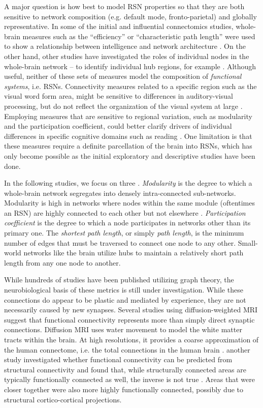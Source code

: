 A major question is how best to model RSN properties so that they are both sensitive to network composition (e.g. default mode, fronto-parietal) and globally representative. In some of the initial and influential connectomics studies, whole-brain measures such as the ``efficiency'' or ``characteristic path length'' were used to show a relationship between intelligence and network architecture \citep{Stam2014}. On the other hand, other studies have investigated the roles of individual nodes in the whole-brain network -- to identify individual hub regions, for example \citep{Betzel2013}. Although useful, neither of these sets of measures model the composition of \textit{functional systems}, i.e. RSNs. Connectivity measures related to a specific region such as the visual word form area, might be sensitive to differences in auditory-visual processing, but do not reflect the organization of the visual system at large \citep{Rubinov2010}. Employing measures that are sensitive to regional variation, such as modularity and the participation coefficient, could better clarify drivers of individual differences in specific cognitive domains such as reading \citep{Cao2016}. One limitation is that these measures require a definite parcellation of the brain into RSNs, which has only become possible as the initial exploratory and descriptive studies have been done.

In the following studies, we focus on three \citep{Rubinov2010}. \textit{Modularity} is the degree to which a whole-brain network segregates into densely intra-connected sub-networks. Modularity is high in networks where nodes within the same module (oftentimes an RSN) are highly connected to each other but not elsewhere \citep{Sporns2013}. \textit{Participation coefficient} is the degree to which a node participates in networks other than its primary one. The \textit{shortest path length}, or simply \textit{path length}, is the minimum number of edges that must be traversed to connect one node to any other. Small-world networks like the brain utilize hubs to maintain a relatively short path length from any one node to another. 

While hundreds of studies have been published utilizing graph theory, the neurobiological basis of these metrics is still under investigation. While these connections do appear to be plastic and mediated by experience, they are not necessarily caused by new synapses. Several studies using diffusion-weighted MRI suggest that functional connectivity represents more than simply direct synaptic connections. Diffusion MRI uses water movement to model the white matter tracts within the brain. At high resolutions, it provides a coarse approximation of the human connectome, i.e. the total connections in the human brain \citep{Sporns2005}. another study investigated whether functional connectivity can be predicted from structural connectivity and found that, while structurally connected areas are typically functionally connected as well, the inverse is not true \citep{Honey2009}. Areas that were closer together were also more highly functionally connected, possibly due to structural cortico-cortical projections. 


